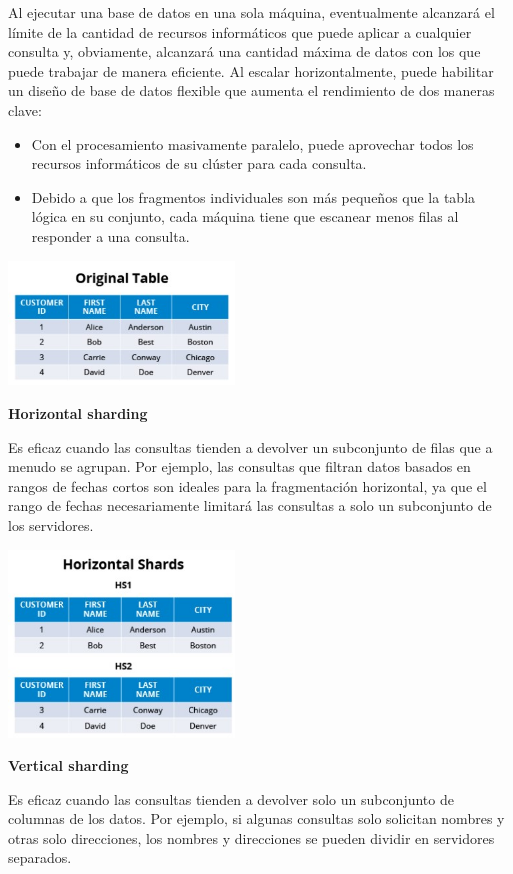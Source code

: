 \documentclass{article}
\begin{document}
\begin{multicols}{2}
Al ejecutar una base de datos en una sola máquina, eventualmente alcanzará el límite de la cantidad de recursos informáticos que puede aplicar a cualquier consulta y, obviamente, alcanzará una cantidad máxima de datos con los que puede trabajar de manera eficiente. Al escalar horizontalmente, puede habilitar un diseño de base de datos flexible que aumenta el rendimiento de dos maneras clave:

\begin{itemize}
    \item Con el procesamiento masivamente paralelo, puede aprovechar todos los recursos informáticos de su clúster para cada consulta.
    \item Debido a que los fragmentos individuales son más pequeños que la tabla lógica en su conjunto, cada máquina tiene que escanear menos filas al responder a una consulta.
\end{itemize}

\includegraphics[width=6cm]{images/originaltable.jpg}

\textbf{Horizontal sharding }

Es eficaz cuando las consultas tienden a devolver un subconjunto de filas que a menudo se agrupan. Por ejemplo, las consultas que filtran datos basados en rangos de fechas cortos son ideales para la fragmentación horizontal, ya que el rango de fechas necesariamente limitará las consultas a solo un subconjunto de los servidores.

\includegraphics[width=6cm]{images/horizontal.jpg}

\textbf{Vertical sharding }

Es eficaz cuando las consultas tienden a devolver solo un subconjunto de columnas de los datos. Por ejemplo, si algunas consultas solo solicitan nombres y otras solo direcciones, los nombres y direcciones se pueden dividir en servidores separados.


\end{multicols}
\end{document}

